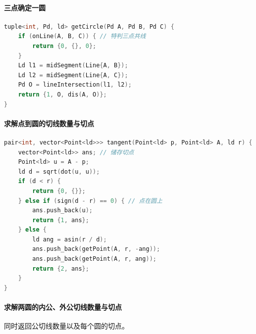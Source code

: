 \hypertarget{ux4e09ux70b9ux786eux5b9aux4e00ux5706}{%
\paragraph{三点确定一圆}\label{ux4e09ux70b9ux786eux5b9aux4e00ux5706}}

\begin{lstlisting}[language={C++}]
tuple<int, Pd, ld> getCircle(Pd A, Pd B, Pd C) {
    if (onLine(A, B, C)) { // 特判三点共线
        return {0, {}, 0};
    }
    Ld l1 = midSegment(Line{A, B});
    Ld l2 = midSegment(Line{A, C});
    Pd O = lineIntersection(l1, l2);
    return {1, O, dis(A, O)};
}
\end{lstlisting}

\hypertarget{ux6c42ux89e3ux70b9ux5230ux5706ux7684ux5207ux7ebfux6570ux91cfux4e0eux5207ux70b9}{%
\paragraph{求解点到圆的切线数量与切点}\label{ux6c42ux89e3ux70b9ux5230ux5706ux7684ux5207ux7ebfux6570ux91cfux4e0eux5207ux70b9}}

\begin{lstlisting}[language={C++}]
pair<int, vector<Point<ld>>> tangent(Point<ld> p, Point<ld> A, ld r) {
    vector<Point<ld>> ans; // 储存切点
    Point<ld> u = A - p;
    ld d = sqrt(dot(u, u));
    if (d < r) {
        return {0, {}};
    } else if (sign(d - r) == 0) { // 点在圆上
        ans.push_back(u);
        return {1, ans};
    } else {
        ld ang = asin(r / d);
        ans.push_back(getPoint(A, r, -ang));
        ans.push_back(getPoint(A, r, ang));
        return {2, ans};
    }
}
\end{lstlisting}

\hypertarget{ux6c42ux89e3ux4e24ux5706ux7684ux5185ux516cux5916ux516cux5207ux7ebfux6570ux91cfux4e0eux5207ux70b9}{%
\paragraph{求解两圆的内公、外公切线数量与切点}\label{ux6c42ux89e3ux4e24ux5706ux7684ux5185ux516cux5916ux516cux5207ux7ebfux6570ux91cfux4e0eux5207ux70b9}}

同时返回公切线数量以及每个圆的切点。


